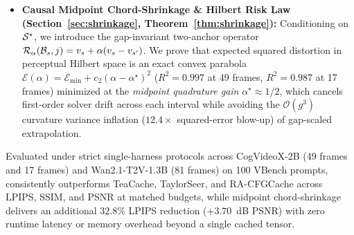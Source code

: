 \begin{itemize}
\item \textbf{Causal Midpoint Chord-Shrinkage \& Hilbert Risk Law (Section~\ref{sec:shrinkage}, Theorem~\ref{thm:shrinkage}):} Conditioning on $\mathcal{S}^\star$, we introduce the gap-invariant two-anchor operator $\mathcal{R}_\alpha(\mathcal{B}_s, j) = v_s + \alpha(v_s - v_{s'})$. We prove that expected squared distortion in perceptual Hilbert space is an exact convex parabola $\mathcal{E}(\alpha) = \mathcal{E}_{\min} + c_2(\alpha - \alpha^\star)^2$ ($R^2 = 0.997$ at 49 frames, $R^2 = 0.987$ at 17 frames) minimized at the \emph{midpoint quadrature gain} $\alpha^\star \approx 1/2$, which cancels first-order solver drift across each interval while avoiding the $\mathcal{O}(g^3)$ curvature variance inflation ($12.4\times$ squared-error blow-up) of gap-scaled extrapolation.
\end{itemize}

Evaluated under strict single-harness protocols across CogVideoX-2B (49 frames and 17 frames) and Wan2.1-T2V-1.3B (81 frames) on 100 VBench prompts, \method{} consistently outperforms TeaCache, TaylorSeer, and RA-CFGCache across LPIPS, SSIM, and PSNR at matched budgets, while midpoint chord-shrinkage delivers an additional $32.8\%$ LPIPS reduction ($+3.70$~dB PSNR) with zero runtime latency or memory overhead beyond a single cached tensor.
